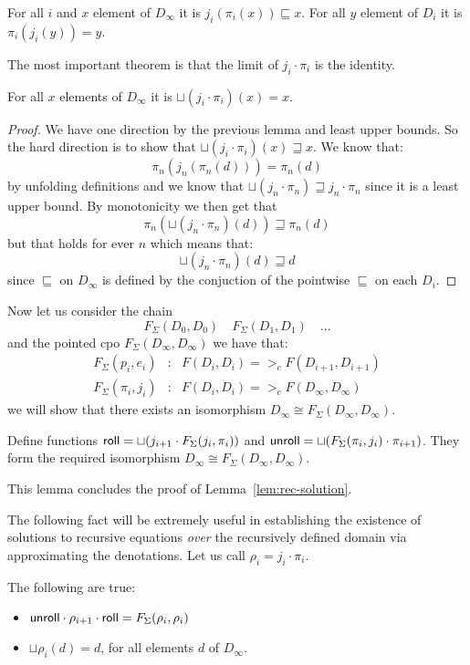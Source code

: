 \documentclass[preprint,nocopyrightspace]{sigplanconf}
\begin{document}
\begin{lemma}
For all $i$ and $x$ element of $D_{\infty}$ it is $j_i(\pi_i(x)) \sqsubseteq x$.
For all $y$ element of $D_{i}$ it is $\pi_i(j_i(y)) = y$.
\end{lemma}
The most important theorem is that the limit of $j_i\cdot\pi_i$ is the identity.
\begin{lemma}\label{lem:id-sqcup}
For all $x$ elements of $D_{\infty}$ it is $\sqcup(j_i\cdot\pi_i)(x) = x$.
\end{lemma}
\begin{proof} We have one direction by the previous lemma and least upper bounds.
So the hard direction is to show that $\sqcup(j_i\cdot\pi_i)(x) \sqsupseteq x$. 
We know that:
\[       \pi_n(j_n(\pi_n(d))) = \pi_n(d) \]
by unfolding definitions and we know that $\sqcup(j_n\cdot\pi_n) \sqsupseteq j_n\cdot\pi_n$
since it is a least upper bound. By monotonicity we then get that 
\[      \pi_n(\sqcup(j_n\cdot\pi_n)(d)) \sqsupseteq \pi_n(d) \] 
but that holds for ever $n$ which means that:
\[       \sqcup(j_n\cdot\pi_n)(d) \sqsupseteq d \] 
since $\sqsubseteq$ on $D_\infty$ is defined by the conjuction of the 
pointwise $\sqsubseteq$ on each $D_i$.
\end{proof}
Now let us consider the chain 
\[ F_{\Sigma}(D_0,D_0) \quad F_{\Sigma}(D_1,D_1) \quad \ldots \] 
and the pointed cpo $F_{\Sigma}(D_{\infty},D_{\infty})$ we have that:
\[\begin{array}{lcl}
    F_{\Sigma}(p_i,e_i)   & : & F(D_i,D_i) =>_c F(D_{i+1},D_{i+1}) \\ 
    F_{\Sigma}(\pi_i,j_i) & : & F(D_i,D_i) =>_c F(D_{\infty},D_{\infty})
\end{array}\] 
we will show that there exists an isomorphism $D_\infty \cong F_{\Sigma}(D_\infty,D_\infty)$.

\begin{lemma} Define functions $\mathsf{roll} = \sqcup(j_{i+1}\cdot F_{\Sigma}(j_i,\pi_i))$ and 
$\mathsf{unroll} = \sqcup (F_{\Sigma}(\pi_i,j_i)\cdot \pi_{i+1})$. They form the required isomorphism 
$D_\infty \cong F_{\Sigma}(D_\infty,D_\infty)$.
\end{lemma}
This lemma concludes the proof of Lemma~\ref{lem:rec-solution}.

The following fact will be extremely useful in establishing the existence of solutions
to recursive equations {\em over} the recursively defined domain via approximating the
denotations. Let us call $\rho_i = j_i\cdot\pi_i$. 

\begin{theorem}\label{lem:min-inv-reqs} The following are true:
\begin{itemize} 
   \item $\mathsf{unroll} \cdot \rho_{i+1} \cdot \mathsf{roll} = F_{\Sigma}(\rho_i,\rho_i)$ 
   \item $\sqcup\rho_i(d) = d$, for all elements $d$ of $D_{\infty}$.
\end{itemize}
\end{theorem}
\end{document}
